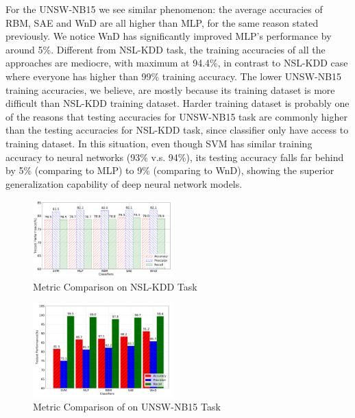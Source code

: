 For the UNSW-NB15 we see similar phenomenon: the average accuracies of RBM, SAE and WnD are
all higher than MLP, for the same reason stated previously.
We notice WnD has significantly improved MLP's performance by around 5\%.
Different from NSL-KDD task, the training accuracies of all the approaches are mediocre,
with maximum at 94.4\%, in contrast to NSL-KDD case where everyone has higher than 99\% training accuracy.
The lower UNSW-NB15 training accuracies, we believe, are mostly because its training dataset
is more difficult than NSL-KDD training dataset.
Harder training dataset is probably one of the reasons that testing accuracies for UNSW-NB15 task
are commonly higher than the testing accuracies for NSL-KDD task,
since classifier only have access to training dataset.
In this situation, even though SVM has similar training accuracy to neural networks (93\% v.s. 94\%),
its testing accuracy falls far behind by 5\% (comparing to MLP) to 9\% (comparing to WnD),
showing the superior generalization capability of deep neural network models.

\begin{figure}[h]
    \centering
    \includegraphics[width=0.48\textwidth]{figures/comp_accuracy_nsl.pdf}
    \caption{Metric Comparison on NSL-KDD Task}
    \label{Fig:CompAccuracyNSL}
\end{figure}

\begin{figure}[h]
    \centering
    \includegraphics[width=0.48\textwidth]{figures/comp_accuracy_unsw.pdf}
    \caption{Metric Comparison of on UNSW-NB15 Task}
    \label{Fig:CompAccuracyUNSW}
\end{figure}

